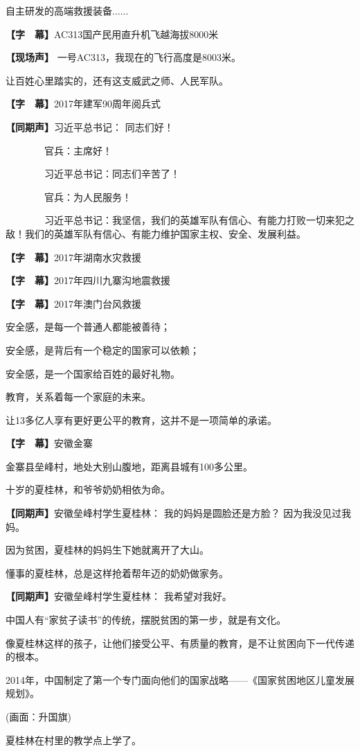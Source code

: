 \documentclass{ctexart}
\newcommand{\zkh}[1]{\textbf{\hspace{-2.7em} 【#1】}}
\begin{document}
 自主研发的高端救援装备......

 \zkh{字　幕}AC313国产民用直升机飞越海拔8000米

 \zkh{现场声} 一号AC313，我现在的飞行高度是8003米。

 让百姓心里踏实的，还有这支威武之师、人民军队。

 \zkh{字　幕}2017年建军90周年阅兵式

 \zkh{同期声}习近平总书记： 同志们好！

 　　　　官兵：主席好！

 　　　　习近平总书记：同志们辛苦了！

 　　　　官兵：为人民服务！

　　　　习近平总书记：我坚信，我们的英雄军队有信心、有能力打败一切来犯之敌！我们的英雄军队有信心、有能力维护国家主权、安全、发展利益。

 \zkh{字　幕}2017年湖南水灾救援

 \zkh{字　幕}2017年四川九寨沟地震救援

 \zkh{字　幕}2017年澳门台风救援

 安全感，是每一个普通人都能被善待；

 安全感，是背后有一个稳定的国家可以依赖；

 安全感，是一个国家给百姓的最好礼物。

 教育，关系着每一个家庭的未来。

 让13多亿人享有更好更公平的教育，这并不是一项简单的承诺。

 \zkh{字　幕}安徽金寨

 金寨县垒峰村，地处大别山腹地，距离县城有100多公里。

 十岁的夏桂林，和爷爷奶奶相依为命。

 \zkh{同期声}安徽垒峰村学生夏桂林： 我的妈妈是圆脸还是方脸？ 因为我没见过我妈。

 因为贫困，夏桂林的妈妈生下她就离开了大山。

 懂事的夏桂林，总是这样抢着帮年迈的奶奶做家务。

 \zkh{同期声}安徽垒峰村学生夏桂林： 我希望对我好。

 中国人有``家贫子读书''的传统，摆脱贫困的第一步，就是有文化。

像夏桂林这样的孩子，让他们接受公平、有质量的教育，是不让贫困向下一代传递的根本。

2014年，中国制定了第一个专门面向他们的国家战略------《国家贫困地区儿童发展规划》。

 (画面：升国旗)

 夏桂林在村里的教学点上学了。
\end{document}
